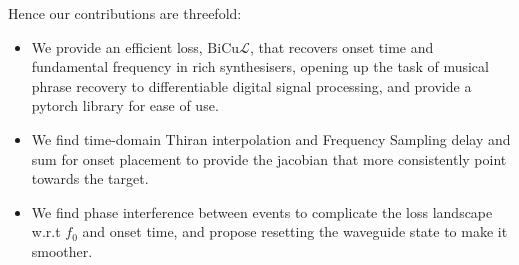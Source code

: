 \documentclass[conference]{IEEEtran}
\newcommand{\bicul}{\ensuremath{\mathrm{BiCu}\mathcal{L}}}
\begin{document}
Hence our contributions are threefold:
\begin{itemize}
    \item We provide an efficient loss, \bicul{}, that recovers onset time and fundamental frequency in rich synthesisers, opening up the task of musical phrase recovery to differentiable digital signal processing, and provide a pytorch library for ease of use.
    \item We find time-domain Thiran interpolation and Frequency Sampling delay and sum for onset placement to provide the jacobian that more consistently point towards the target.
    \item We find phase interference between events to complicate the loss landscape w.r.t $f_0$ and onset time, and propose resetting the waveguide state to make it smoother.
\end{itemize}

\end{document}
